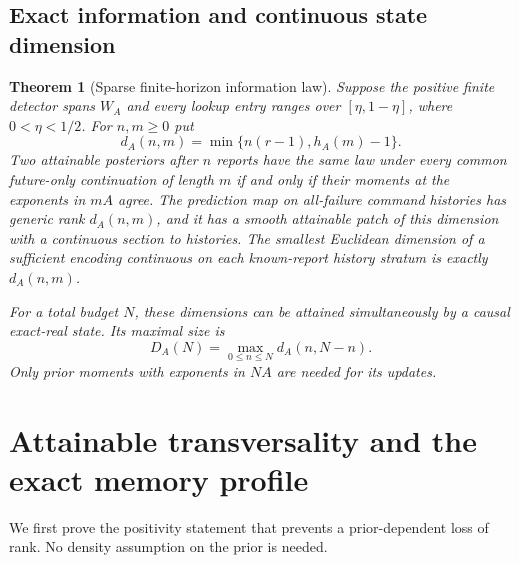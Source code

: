 \documentclass[11pt]{amsart}
\newtheorem{theorem}{Theorem}[section]
\theoremstyle{definition}\newtheorem{definition}[theorem]{Definition}
\theoremstyle{remark}\newtheorem{remark}[theorem]{Remark}
\begin{document}
\subsection{Exact information and continuous state dimension}
\begin{theorem}[Sparse finite-horizon information law]\label{thm:main}
Suppose the positive finite detector spans $W_A$ and every lookup entry
ranges over $[\eta,1-\eta]$, where $0<\eta<1/2$. For $n,m\ge0$ put
\begin{equation}\label{eq:main-dimension}
 d_A(n,m)=\min\{n(r-1),h_A(m)-1\}.
\end{equation}
Two attainable posteriors after $n$ reports have the same law under every
common future-only continuation of length $m$ if and only if their moments
at the exponents in $mA$ agree. The prediction map on all-failure command
histories has generic rank $d_A(n,m)$, and it has a smooth attainable patch
of this dimension with a continuous section to histories. The smallest
Euclidean dimension of a sufficient encoding continuous on each
known-report history stratum is exactly $d_A(n,m)$.

For a total budget $N$, these dimensions can be attained simultaneously
by a causal exact-real state. Its maximal size is
\begin{equation}\label{eq:peak}
 D_A(N)=\max_{0\le n\le N}d_A(n,N-n).
\end{equation}
Only prior moments with exponents in $NA$ are needed for its updates.
\end{theorem}

\section{Attainable transversality and the exact memory profile}\label{sec:rank}
We first prove the positivity statement that prevents a prior-dependent
loss of rank. No density assumption on the prior is needed.
\end{document}
